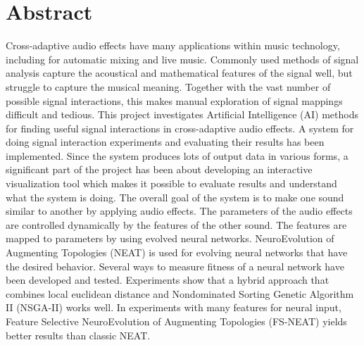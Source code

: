 \section*{Abstract}
Cross-adaptive audio effects have many applications within music technology, including for automatic mixing and live music. Commonly used methods of signal analysis capture the acoustical and mathematical features of the signal well, but struggle to capture the musical meaning. Together with the vast number of possible signal interactions, this makes manual exploration of signal mappings difficult and tedious. This project investigates Artificial Intelligence (AI) methods for finding useful signal interactions in cross-adaptive audio effects. A system for doing signal interaction experiments and evaluating their results has been implemented. Since the system produces lots of output data in various forms, a significant part of the project has been about developing an interactive visualization tool which makes it possible to evaluate results and understand what the system is doing. The overall goal of the system is to make one sound similar to another by applying audio effects. The parameters of the audio effects are controlled dynamically by the features of the other sound. The features are mapped to parameters by using evolved neural networks. NeuroEvolution of Augmenting Topologies (NEAT) is used for evolving neural networks that have the desired behavior. Several ways to measure fitness of a neural network have been developed and tested. Experiments show that a hybrid approach that combines local euclidean distance and Nondominated Sorting Genetic Algorithm II (NSGA-II) works well. In experiments with many features for neural input, Feature Selective NeuroEvolution of Augmenting Topologies (FS-NEAT) yields better results than classic NEAT.
